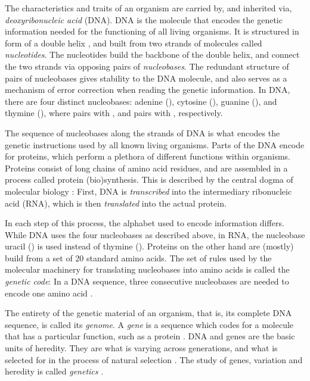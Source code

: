 
The characteristics and traits of an organism are carried by, and inherited via, \emph{deoxyribonucleic acid} (DNA).
DNA is the molecule that encodes the genetic information needed for the functioning of all living organisms.
It is structured in form of a double helix \cite{Watson1953},
and built from two strands of molecules called \emph{nucleotides}.
The nucleotides build the backbone of the double helix,
and connect the two strands via opposing pairs of \emph{nucleobases}.
The redundant structure of pairs of nucleobases gives stability to the DNA molecule,
and also serves as a mechanism of error correction when reading the genetic information.
In DNA, there are four distinct nucleobases:
adenine (), cytosine (), guanine (), and thymine (),
where  pairs with , and  pairs with , respectively.


The sequence of nucleobases along the strands of DNA is what encodes the genetic instructions
used by all known living organisms.
Parts of the DNA encode for proteins,
which perform a plethora of different functions within organisms.
Proteins consist of long chains of amino acid residues, and
are assembled in a process called protein (bio)synthesis.
This is described by the central dogma of molecular biology \cite{Crick1958,Crick1970}:
First, DNA is \emph{transcribed} into the intermediary ribonucleic acid (RNA),
which is then \emph{translated} into the actual protein.

In each step of this process, the alphabet used to encode information differs.
While DNA uses the four nucleobases as described above,
in RNA, the nucleobase uracil () is used instead of thymine ().
Proteins on the other hand are (mostly) build from a set of \num{20} standard amino acids.
The set of rules used by the molecular machinery for translating nucleobases into amino acids
is called the \emph{genetic code}:
In a DNA sequence, three consecutive nucleobases are needed to encode one amino acid \cite{Shu2017}.

The entirety of the genetic material of an organism, that is, its complete DNA sequence, is called its \emph{genome}.
A \emph{gene} is a sequence which codes for a molecule that has a particular function, such as a protein \cite{Gericke2007}.
DNA and genes are the basic units of heredity.
They are what is varying across generations,
and what is selected for in the process of natural selection \cite{Dawkins1989}.
The study of genes, variation and heredity is called \emph{genetics} \cite{Griffiths2000}.

